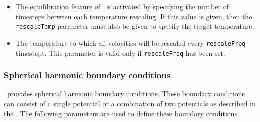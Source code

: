 \begin{itemize}

\item
{}
{The equilibration feature of \NAMD\ is activated by 
specifying the number of timesteps between each temperature rescaling.  
If this value is given, then the \verb!rescaleTemp! parameter must also 
be given to specify the target temperature. }

\item
{}
{The temperature to which all velocities will be rescaled
every \verb!rescaleFreq! timesteps.  
This parameter is valid only if \verb!rescaleFreq! has been set.}

\end{itemize}

\subsubsection{Spherical harmonic boundary conditions}

\NAMD\ provides spherical harmonic boundary conditions.  These 
boundary conditions can consist of a single potential or a 
combination of two potentials as described in the \PG.  
The following parameters are used to define these boundary conditions.  

